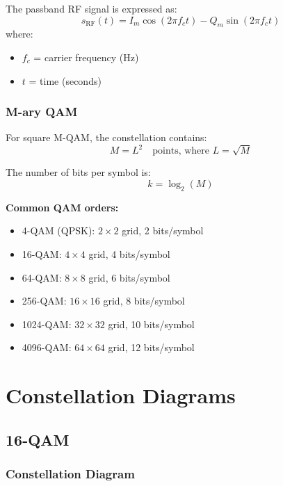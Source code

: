 The passband RF signal is expressed as:
\begin{equation}
s_{\text{RF}}(t) = I_m \cos(2\pi f_c t) - Q_m \sin(2\pi f_c t)
\label{eq:qam-passband}
\end{equation}
where:
\begin{itemize}
\item $f_c$ = carrier frequency (Hz)
\item $t$ = time (seconds)
\end{itemize}

\subsubsection{M-ary QAM}

For square M-QAM, the constellation contains:
\begin{equation}
M = L^2 \quad \text{points, where } L = \sqrt{M}
\label{eq:qam-m}
\end{equation}

The number of bits per symbol is:
\begin{equation}
k = \log_2(M)
\label{eq:qam-bits}
\end{equation}

\textbf{Common QAM orders:}
\begin{itemize}
\item 4-QAM (QPSK): $2 \times 2$ grid, 2 bits/symbol
\item 16-QAM: $4 \times 4$ grid, 4 bits/symbol
\item 64-QAM: $8 \times 8$ grid, 6 bits/symbol
\item 256-QAM: $16 \times 16$ grid, 8 bits/symbol
\item 1024-QAM: $32 \times 32$ grid, 10 bits/symbol
\item 4096-QAM: $64 \times 64$ grid, 12 bits/symbol
\end{itemize}

\section{Constellation Diagrams}

\subsection{16-QAM}

\subsubsection{Constellation Diagram}

